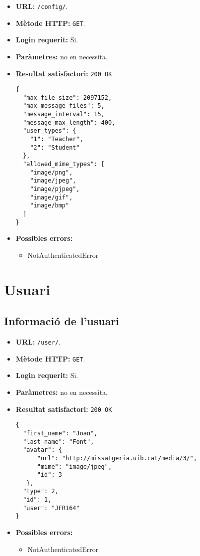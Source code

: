 \begin{itemize}
\item \textbf{\ac{URL}: } \texttt{/config/}.
\item \textbf{Mètode \ac{HTTP}: } \texttt{GET}.
\item \textbf{Login requerit:} Si.
\item \textbf{Paràmetres:} no en necessita.
	
\item \textbf{Resultat satisfactori:} \texttt{200 OK}
	\begin{verbatim}
{
  "max_file_size": 2097152,
  "max_message_files": 5,
  "message_interval": 15,
  "message_max_length": 400,
  "user_types": {
    "1": "Teacher",
    "2": "Student"
  },
  "allowed_mime_types": [
    "image/png",
    "image/jpeg",
    "image/pjpeg",
    "image/gif",
    "image/bmp"
  ]
}
	\end{verbatim}
\item \textbf{Possibles errors:}
	\begin{itemize}
		\item NotAuthenticatedError
	\end{itemize}
\end{itemize}

\section{Usuari}

\subsection{Informació de l'usuari}

\begin{itemize}
\item \textbf{\ac{URL}: } \texttt{/user/}.
\item \textbf{Mètode \ac{HTTP}: } \texttt{GET}.
\item \textbf{Login requerit:} Si.
\item \textbf{Paràmetres:} no en necessita.
	
\item \textbf{Resultat satisfactori:} \texttt{200 OK}
	\begin{verbatim}
{
  "first_name": "Joan",
  "last_name": "Font",
  "avatar": {
      "url": "http://missatgeria.uib.cat/media/3/",
      "mime": "image/jpeg",
      "id": 3
   },
  "type": 2,
  "id": 1,
  "user": "JFR164"
}
	\end{verbatim}
\item \textbf{Possibles errors:}
	\begin{itemize}
		\item NotAuthenticatedError
	\end{itemize}
\end{itemize}
